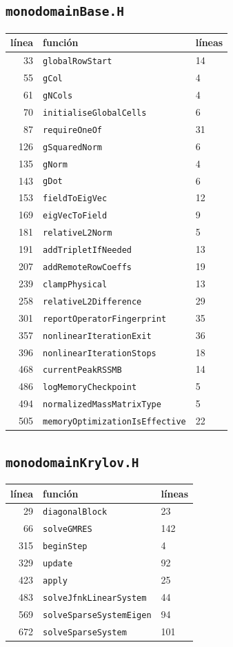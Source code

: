 \documentclass[11pt,a4paper]{article}
\begin{document}
\subsection*{\texttt{monodomainBase.H}}
\begin{longtable}{rll}
\toprule
línea & función & líneas \\
\midrule
\endhead
33 & \texttt{globalRowStart} & 14 \\
55 & \texttt{gCol} & 4 \\
61 & \texttt{gNCols} & 4 \\
70 & \texttt{initialiseGlobalCells} & 6 \\
87 & \texttt{requireOneOf} & 31 \\
126 & \texttt{gSquaredNorm} & 6 \\
135 & \texttt{gNorm} & 4 \\
143 & \texttt{gDot} & 6 \\
153 & \texttt{fieldToEigVec} & 12 \\
169 & \texttt{eigVecToField} & 9 \\
181 & \texttt{relativeL2Norm} & 5 \\
191 & \texttt{addTripletIfNeeded} & 13 \\
207 & \texttt{addRemoteRowCoeffs} & 19 \\
239 & \texttt{clampPhysical} & 13 \\
258 & \texttt{relativeL2Difference} & 29 \\
301 & \texttt{reportOperatorFingerprint} & 35 \\
357 & \texttt{nonlinearIterationExit} & 36 \\
396 & \texttt{nonlinearIterationStops} & 18 \\
468 & \texttt{currentPeakRSSMB} & 14 \\
486 & \texttt{logMemoryCheckpoint} & 5 \\
494 & \texttt{normalizedMassMatrixType} & 5 \\
505 & \texttt{memoryOptimizationIsEffective} & 22 \\
\bottomrule
\end{longtable}
\subsection*{\texttt{monodomainKrylov.H}}
\begin{longtable}{rll}
\toprule
línea & función & líneas \\
\midrule
\endhead
29 & \texttt{diagonalBlock} & 23 \\
66 & \texttt{solveGMRES} & 142 \\
315 & \texttt{beginStep} & 4 \\
329 & \texttt{update} & 92 \\
423 & \texttt{apply} & 25 \\
483 & \texttt{solveJfnkLinearSystem} & 44 \\
569 & \texttt{solveSparseSystemEigen} & 94 \\
672 & \texttt{solveSparseSystem} & 101 \\
\bottomrule
\end{longtable}
\end{document}
